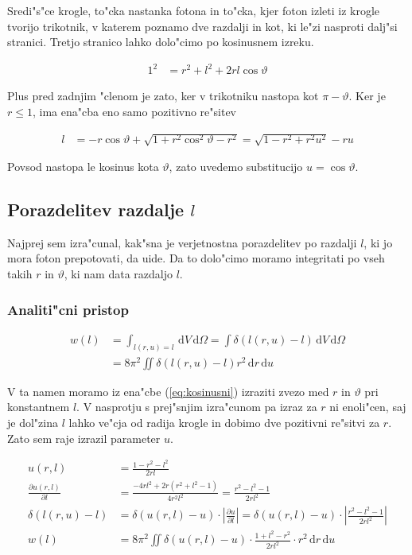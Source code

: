 \documentclass[a4paper,10pt]{article}
\renewcommand{\theta}{\vartheta}
\newcommand{\dd}{\,\mathrm{d}}
\begin{document}
Sredi"s"ce krogle, to"cka nastanka fotona in to"cka, kjer foton izleti iz krogle tvorijo trikotnik, v katerem poznamo dve razdalji in kot, ki le"zi nasproti dalj"si stranici. Tretjo stranico lahko dolo"cimo po kosinusnem izreku. 

\begin{align}
 1^2 &= r^2 + l^2 + 2rl\cos\theta \label{eq:kosinusni}
\end{align}

Plus pred zadnjim "clenom je zato, ker v trikotniku nastopa kot $\pi-\theta$. Ker je $r\leq1$, ima ena"cba eno samo pozitivno re"sitev

\begin{align}
 l &= -r\cos\theta + \sqrt{1 + r^2\cos^2\theta - r^2} = \sqrt{1 - r^2 +r^2u^2} - ru
\end{align}

Povsod nastopa le kosinus kota $\theta$, zato uvedemo substitucijo $u=\cos\theta$. 

\subsection{Porazdelitev razdalje $l$}
Najprej sem izra"cunal, kak"sna je verjetnostna porazdelitev po razdalji $l$, ki jo mora foton prepotovati, da uide. Da to dolo"cimo moramo integritati po vseh takih $r$ in $\theta$, ki nam data razdaljo $l$. 

\subsubsection{Analiti"cni pristop}

\begin{align}
 w(l) &= \int_{l(r,u)=l} \dd V \dd \Omega = \int \delta(l(r,u)-l) \dd V \dd \Omega \\
  &= 8\pi^2\iint \delta(l(r,u)-l) r^2 \dd r \dd u
\end{align}

V ta namen moramo iz ena"cbe (\ref{eq:kosinusni}) izraziti zvezo med $r$ in $\theta$ pri konstantnem $l$. V nasprotju s prej"snjim izra"cunom pa izraz za $r$ ni enoli"cen, saj je dol"zina $l$ lahko ve"cja od radija krogle in dobimo dve pozitivni re"sitvi za $r$. Zato sem raje izrazil parameter $u$. 

\begin{align}
 u(r,l) &= \frac{1 - r^2 - l^2}{2rl} \\
 \frac{\partial u(r,l)}{\partial l} &=  \frac{ -4rl^2 + 2r(r^2+l^2-1) }{4r^2l^2} = \frac{r^2 - l^2 - 1}{2rl^2}\\
\delta(l(r,u)-l) &= \delta(u(r,l) - u) \cdot \left|\frac{\partial u}{\partial l}\right| = \delta(u(r,l) - u)\cdot \left|\frac{r^2 - l^2 - 1}{2rl^2}\right| \\
w(l) &= 8\pi^2 \iint \delta(u(r,l) - u)\cdot\frac{1 + l^2 - r^2}{2rl^2} \cdot r^2 \dd r \dd u
\end{align}
\end{document}
